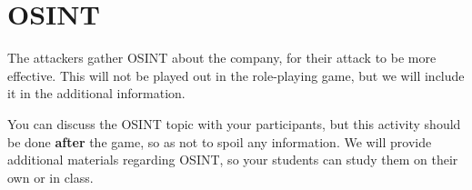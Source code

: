\section{OSINT}

The attackers gather OSINT about the company, for their attack to be more effective.
This will not be played out in the role-playing game, but we will include it in the additional information.

\begin{hint}
    You can discuss the OSINT topic with your participants, but this activity should be done \textbf{after} the game, so as not to spoil any information.
    We will provide additional materials regarding OSINT, so your students can study them on their own or in class.
\end{hint}
